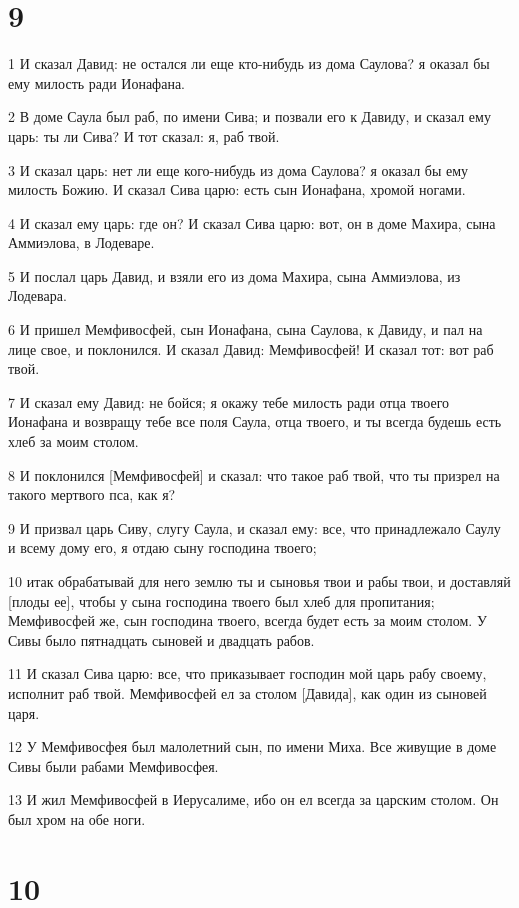 \chapter{9}

\par 1 И сказал Давид: не остался ли еще кто-нибудь из дома Саулова? я оказал бы ему милость ради Ионафана.
\par 2 В доме Саула был раб, по имени Сива; и позвали его к Давиду, и сказал ему царь: ты ли Сива? И тот сказал: я, раб твой.
\par 3 И сказал царь: нет ли еще кого-нибудь из дома Саулова? я оказал бы ему милость Божию. И сказал Сива царю: есть сын Ионафана, хромой ногами.
\par 4 И сказал ему царь: где он? И сказал Сива царю: вот, он в доме Махира, сына Аммиэлова, в Лодеваре.
\par 5 И послал царь Давид, и взяли его из дома Махира, сына Аммиэлова, из Лодевара.
\par 6 И пришел Мемфивосфей, сын Ионафана, сына Саулова, к Давиду, и пал на лице свое, и поклонился. И сказал Давид: Мемфивосфей! И сказал тот: вот раб твой.
\par 7 И сказал ему Давид: не бойся; я окажу тебе милость ради отца твоего Ионафана и возвращу тебе все поля Саула, отца твоего, и ты всегда будешь есть хлеб за моим столом.
\par 8 И поклонился [Мемфивосфей] и сказал: что такое раб твой, что ты призрел на такого мертвого пса, как я?
\par 9 И призвал царь Сиву, слугу Саула, и сказал ему: все, что принадлежало Саулу и всему дому его, я отдаю сыну господина твоего;
\par 10 итак обрабатывай для него землю ты и сыновья твои и рабы твои, и доставляй [плоды ее], чтобы у сына господина твоего был хлеб для пропитания; Мемфивосфей же, сын господина твоего, всегда будет есть за моим столом. У Сивы было пятнадцать сыновей и двадцать рабов.
\par 11 И сказал Сива царю: все, что приказывает господин мой царь рабу своему, исполнит раб твой. Мемфивосфей ел за столом [Давида], как один из сыновей царя.
\par 12 У Мемфивосфея был малолетний сын, по имени Миха. Все живущие в доме Сивы были рабами Мемфивосфея.
\par 13 И жил Мемфивосфей в Иерусалиме, ибо он ел всегда за царским столом. Он был хром на обе ноги.

\chapter{10}

